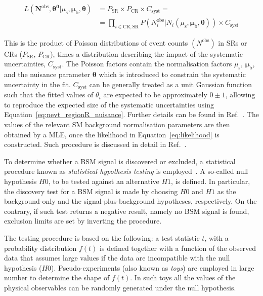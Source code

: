 			\begin{equation}
				\begin{split}
					L \left ( \bm{N}^{\mathrm{obs}}, \bm{\theta^0} | \mu_\mathrm{s}, \bm{\mu_{\mathrm{b}}, \theta} \right ) & = P_{\mathrm{SR}} \times P_{\mathrm{CR}} \times C_{\mathrm{syst}} = \\
					& = \prod_{i \in \mathrm{CR, SR}} P \left ( N_i^{\mathrm{obs}} | N_i \left( \mu_\mathrm{s}, \bm{\mu_{\mathrm{b}}, \theta} \right) \right ) \times C_{\mathrm{syst}}
				\end{split}
				\label{eq:likelihood}
			\end{equation}

			\noindent This is the product of Poisson distributions of event counts $\left ( {N}^{\mathrm{obs}} \right )$ in \acp{SR} or \acp{CR} ($P_{\mathrm{SR}}$, $P_{\mathrm{CR}}$), times a distribution describing the impact of the systematic uncertainties, $C_{\mathrm{syst}}$. The Poisson factors contain the normalisation factors $\mu_\mathrm{s}$, $\bm{\mu_{\mathrm{b}}}$, and the nuisance parameter $\bm{\theta}$ which is introduced to constrain the systematic uncertainty in the fit. $C_{\mathrm{syst}}$ can be generally treated as a unit Gaussian function such that the fitted values of $\theta_i$ are expected to be approximately $0\pm1$, allowing to reproduce the expected size of the systematic uncertainties using Equation~\ref{eq:nevt_regionR_nuisance}. Further details can be found in Ref.~\cite{histfitter}. The values of the relevant \ac{SM} background normalisation parameters are then obtained by a \ac{MLE}, once the likelihood in Equation~\ref{eq:likelihood} is constructed. Such procedure is discussed in detail in Ref.~\cite{cowan1998statistical}.

			To determine whether a \ac{BSM} signal is discovered or excluded, a statistical procedure known as \emph{statistical hypothesis testing} is employed~\cite{Cowan2015}. A so-called null hypothesis $H0$, to be tested against an alternative $H1$, is defined. In particular, the discovery test for a \ac{BSM} signal is made by choosing $H0$ and $H1$ as the background-only and the signal-plus-background hypotheses, respectively. On the contrary, if such test returns a negative result, namely no \ac{BSM} signal is found, exclusion limits are set by inverting the procedure. 

			The testing procedure is based on the following: a test statistic $t$, with a probability distribution $f(t)$ is defined together with a function of the observed data that assumes large values if the data are incompatible with the null hypothesis ($H0$). Pseudo-experiments (also known as \emph{toys}) are employed in large number to determine the shape of $f(t)$. In such toys all the values of the physical observables can be randomly generated under the null hypothesis. %

